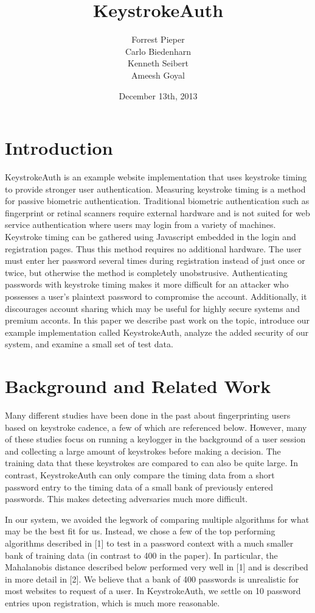 \documentclass{article}
\title{KeystrokeAuth}
\author{
  Forrest Pieper\\
  Carlo Biedenharn\\
  Kenneth Seibert\\
  Ameesh Goyal
}
\date{December 13th, 2013}
\begin{document}
\maketitle

\abstract{
}

\section{Introduction}
\label{introduction}
KeystrokeAuth is an example website implementation that uses keystroke timing to provide stronger user authentication.
Measuring keystroke timing is a method for passive biometric authentication. 
Traditional biometric authentication such as fingerprint or retinal scanners require external hardware and is not suited for web service authentication where users may login from a variety of machines. 
Keystroke timing can be gathered using Javascript embedded in the login and registration pages.
Thus this method requires no additional hardware.
The user must enter her password several times during registration instead of just once or twice, but otherwise the method is completely unobstrusive.
Authenticating passwords with keystroke timing makes it more difficult for an attacker who possesses a user's plaintext password to compromise the account.
Additionally, it discourages account sharing which may be useful for highly secure systems and premium acconts.
In this paper we describe past work on the topic, introduce our example implementation called KeystrokeAuth, analyze the added security of our system, and examine a small set of test data.

\section{Background and Related Work}

Many different studies have been done in the past about fingerprinting users based on keystroke cadence, a few of which are referenced below. However, many of these studies focus on running a keylogger in the background of a user session and collecting a large amount of keystrokes before making a decision. The training data that these keystrokes are compared to can also be quite large. In contrast, KeystrokeAuth can only compare the timing data from a short password entry to the timing data of a small bank of previously entered passwords. This makes detecting adversaries much more difficult.

In our system, we avoided the legwork of comparing multiple algorithms for what may be the best fit for us. Instead, we chose a few of the top performing algorithms described in {[}1{]} to test in a password context with a much smaller bank of training data (in contrast to 400 in the paper). In particular, the Mahalanobis distance described below performed very well in {[}1{]} and is described in more detail in {[}2{]}. We believe that a bank of 400 passwords is unrealistic for most websites to request of a user. In KeystrokeAuth, we settle on 10 password entries upon registration, which is much more reasonable. 
\end{document}
